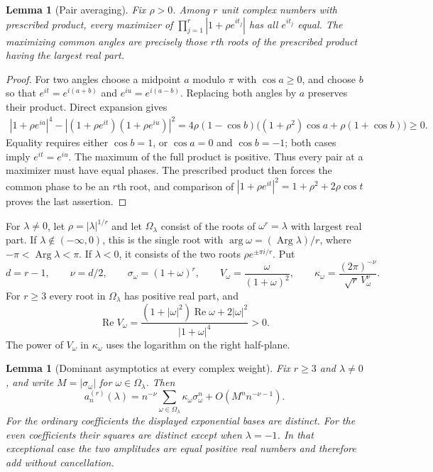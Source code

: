 \documentclass[11pt,a4paper]{article}
\newtheorem{lemma}[theorem]{Lemma}
\theoremstyle{definition}
\theoremstyle{remark}
\numberwithin{equation}{section}
\begin{document}
\begin{lemma}[Pair averaging]
\label{p5:lem:WF-pair}
Fix $\rho>0$. Among $r$ unit complex numbers with prescribed product,
every maximizer of $\prod_{j=1}^r|1+\rho e^{it_j}|$ has all
$e^{it_j}$ equal. The maximizing common angles are precisely those
$r$th roots of the prescribed product having the largest real part.
\end{lemma}

\begin{proof}
For two angles choose a midpoint $a$ modulo $\pi$ with $\cos a\ge0$,
and choose $b$ so that $e^{it}=e^{i(a+b)}$ and
$e^{iu}=e^{i(a-b)}$. Replacing both angles by $a$ preserves their
product. Direct expansion gives
\begin{align*}
 |1+\rho e^{ia}|^4
 -|(1+\rho e^{it})(1+\rho e^{iu})|^2
 =4\rho(1-\cos b)
       \bigl((1+\rho^2)\cos a+\rho(1+\cos b)\bigr)\ge0.
\end{align*}
Equality requires either $\cos b=1$, or $\cos a=0$ and
$\cos b=-1$; both cases imply $e^{it}=e^{iu}$.
The maximum of the full product is positive. Thus every pair at a
maximizer must have equal phases. The prescribed product then forces
the common phase to be an $r$th root, and comparison of
$|1+\rho e^{it}|^2=1+\rho^2+2\rho\cos t$ proves the last assertion.
\end{proof}

For $\lambda\ne0$, let $\rho=|\lambda|^{1/r}$ and let
$\Omega_\lambda$ consist of the roots of $\omega^r=\lambda$ with
largest real part. If $\lambda\notin(-\infty,0)$, this is the single
root with $\arg\omega=(\operatorname{Arg}\lambda)/r$, where
$-\pi<\operatorname{Arg}\lambda<\pi$. If $\lambda<0$, it consists
of the two roots $\rho e^{\pm\pi i/r}$. Put
\[
 d=r-1,\qquad \nu=d/2,\qquad
 \sigma_\omega=(1+\omega)^r,\qquad
 V_\omega=\frac{\omega}{(1+\omega)^2},\qquad
 \kappa_\omega=\frac{(2\pi)^{-\nu}}{\sqrt r\,V_\omega^{\nu}}.
\]
For $r\ge3$ every root in $\Omega_\lambda$ has positive real part,
and
\[
 \operatorname{Re}V_\omega
 =\frac{(1+|\omega|^2)\operatorname{Re}\omega+2|\omega|^2}
        {|1+\omega|^4}>0.
\]
The power of $V_\omega$ in $\kappa_\omega$ uses the logarithm on
the right half-plane.

\begin{lemma}[Dominant asymptotics at every complex weight]
\label{p5:lem:WF-saddles}
Fix $r\ge3$ and $\lambda\ne0$, and write
$M=|\sigma_\omega|$ for $\omega\in\Omega_\lambda$. Then
\begin{equation}\label{p5:eq:WF-asymptotic}
 a_n^{(r)}(\lambda)
 =n^{-\nu}\sum_{\omega\in\Omega_\lambda}
                      \kappa_\omega\sigma_\omega^n
       +O(M^n n^{-\nu-1}).
\end{equation}
For the ordinary coefficients the displayed exponential bases are
distinct. For the even coefficients their squares are distinct except
when $\lambda=-1$. In that exceptional case the two amplitudes are
equal positive real numbers and therefore add without cancellation.
\end{lemma}
\end{document}

